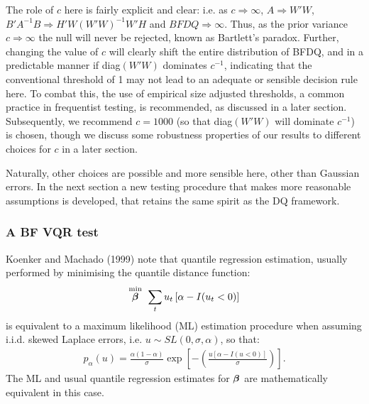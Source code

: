 \documentclass[12pt,epsf]{article}
\newcommand{\utwi}[1]{\mbox{\boldmath $ #1$}}
\begin{document}
The role of $c$ here is fairly explicit and clear: i.e. as $c \Rightarrow \infty$, $A \Rightarrow W'W$, $B'A^{-1}B \Rightarrow H'W(W'W)^{-1}W'H$
and $BFDQ \Rightarrow \infty$. Thus, as the prior variance $c \Rightarrow \infty$ the
null will never be rejected, known as Bartlett's paradox. Further, changing the value of $c$ will clearly shift the entire
distribution of BFDQ, and in a predictable manner if diag$(W'W)$ dominates $c^{-1}$, indicating that the conventional threshold of 1 may not
lead to an adequate or sensible decision rule here. To combat this, the use of empirical size adjusted thresholds, a common practice in
frequentist testing, is recommended, as discussed in a later section. Subsequently, we recommend $c=1000$ (so that diag$(W'W)$ will dominate
$c^{-1}$) is chosen, though we discuss some robustness properties of our results to different choices for $c$ in a later section.

Naturally, other choices are possible and more sensible here, other than Gaussian errors. In the next
section a new testing procedure that makes more reasonable assumptions is developed, that retains the same spirit as the DQ framework.

\subsubsection{A BF VQR test}
Koenker and Machado (1999) note that quantile regression estimation, usually performed by minimising the quantile distance function:
\begin{eqnarray*}
\stackrel{\rm min}{\utwi{\beta}} \,\, \sum_{t} u_{t} \left[\alpha-I(u_{t}<0)\right]
\end{eqnarray*}
is equivalent to a maximum likelihood (ML) estimation procedure when assuming i.i.d. skewed Laplace errors,
i.e. $u \sim SL(0,\sigma,\alpha)$, so that:
\begin{eqnarray*}
p_{\alpha}(u)=\frac{\alpha(1-\alpha)}{\sigma}\exp\left[-\left (\frac{u\left[\alpha-I(u<0)\right]}{\sigma}\right)\right].
\end{eqnarray*}
The ML and usual quantile regression estimates for $\utwi{\beta}$ are mathematically equivalent in this case.
\end{document}
